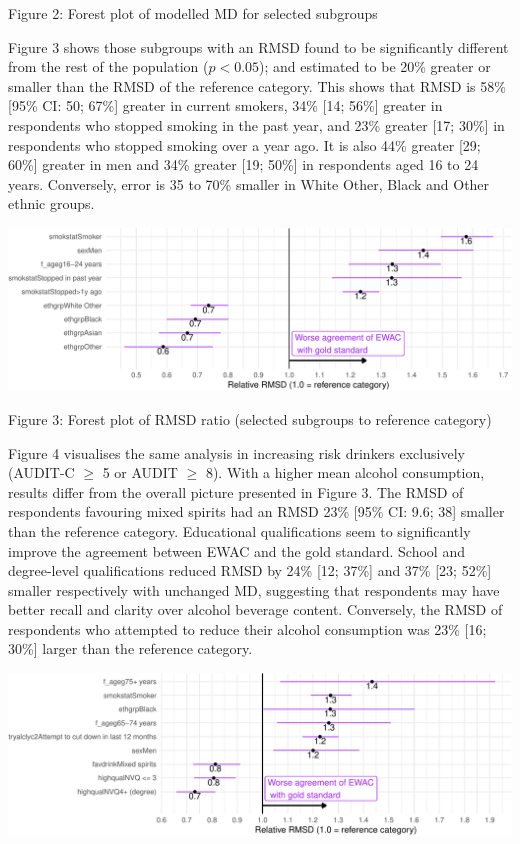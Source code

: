 \documentclass[]{article}
\begin{document}
Figure 2: Forest plot of modelled MD for selected subgroups

Figure 3 shows those subgroups with an RMSD found to be significantly
different from the rest of the population (\(p < 0.05\)); and estimated
to be 20\% greater or smaller than the RMSD of the reference category.
This shows that RMSD is 58\% {[}95\% CI: 50; 67\%{]} greater in current
smokers, 34\% {[}14; 56\%{]} greater in respondents who stopped smoking
in the past year, and 23\% greater {[}17; 30\%{]} in respondents who
stopped smoking over a year ago. It is also 44\% greater {[}29; 60\%{]}
greater in men and 34\% greater {[}19; 50\%{]} in respondents aged 16 to
24 years. Conversely, error is 35 to 70\% smaller in White Other, Black
and Other ethnic groups.

\includegraphics{analysis_files/figure-latex/ewac_subgroup_error-1.pdf}

Figure 3: Forest plot of RMSD ratio (selected subgroups to reference
category)

Figure 4 visualises the same analysis in increasing risk drinkers
exclusively (AUDIT-C \(\geq\) 5 or AUDIT \(\geq\) 8). With a higher mean
alcohol consumption, results differ from the overall picture presented
in Figure 3. The RMSD of respondents favouring mixed spirits had an RMSD
23\% {[}95\% CI: 9.6; 38{]} smaller than the reference category.
Educational qualifications seem to significantly improve the agreement
between EWAC and the gold standard. School and degree-level
qualifications reduced RMSD by 24\% {[}12; 37\%{]} and 37\% {[}23;
52\%{]} smaller respectively with unchanged MD, suggesting that
respondents may have better recall and clarity over alcohol beverage
content. Conversely, the RMSD of respondents who attempted to reduce
their alcohol consumption was 23\% {[}16; 30\%{]} larger than the
reference category.

\includegraphics{analysis_files/figure-latex/ewac_subgroup_error_increasedrisk-1.pdf}
\end{document}

